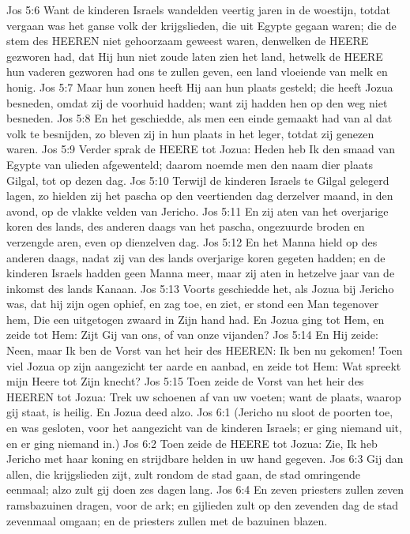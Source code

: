 Jos 5:6  Want de kinderen Israels wandelden veertig jaren in de woestijn, totdat vergaan was het ganse volk der krijgslieden, die uit Egypte gegaan waren; die de stem des HEEREN niet gehoorzaam geweest waren, denwelken de HEERE gezworen had, dat Hij hun niet zoude laten zien het land, hetwelk de HEERE hun vaderen gezworen had ons te zullen geven, een land vloeiende van melk en honig.
Jos 5:7  Maar hun zonen heeft Hij aan hun plaats gesteld; die heeft Jozua besneden, omdat zij de voorhuid hadden; want zij hadden hen op den weg niet besneden.
Jos 5:8  En het geschiedde, als men een einde gemaakt had van al dat volk te besnijden, zo bleven zij in hun plaats in het leger, totdat zij genezen waren.
Jos 5:9  Verder sprak de HEERE tot Jozua: Heden heb Ik den smaad van Egypte van ulieden afgewenteld; daarom noemde men den naam dier plaats Gilgal, tot op dezen dag.
Jos 5:10  Terwijl de kinderen Israels te Gilgal gelegerd lagen, zo hielden zij het pascha op den veertienden dag derzelver maand, in den avond, op de vlakke velden van Jericho.
Jos 5:11  En zij aten van het overjarige koren des lands, des anderen daags van het pascha, ongezuurde broden en verzengde aren, even op dienzelven dag.
Jos 5:12  En het Manna hield op des anderen daags, nadat zij van des lands overjarige koren gegeten hadden; en de kinderen Israels hadden geen Manna meer, maar zij aten in hetzelve jaar van de inkomst des lands Kanaan.
Jos 5:13  Voorts geschiedde het, als Jozua bij Jericho was, dat hij zijn ogen ophief, en zag toe, en ziet, er stond een Man tegenover hem, Die een uitgetogen zwaard in Zijn hand had. En Jozua ging tot Hem, en zeide tot Hem: Zijt Gij van ons, of van onze vijanden?
Jos 5:14  En Hij zeide: Neen, maar Ik ben de Vorst van het heir des HEEREN: Ik ben nu gekomen! Toen viel Jozua op zijn aangezicht ter aarde en aanbad, en zeide tot Hem: Wat spreekt mijn Heere tot Zijn knecht?
Jos 5:15  Toen zeide de Vorst van het heir des HEEREN tot Jozua: Trek uw schoenen af van uw voeten; want de plaats, waarop gij staat, is heilig. En Jozua deed alzo.
Jos 6:1  (Jericho nu sloot de poorten toe, en was gesloten, voor het aangezicht van de kinderen Israels; er ging niemand uit, en er ging niemand in.)
Jos 6:2  Toen zeide de HEERE tot Jozua: Zie, Ik heb Jericho met haar koning en strijdbare helden in uw hand gegeven.
Jos 6:3  Gij dan allen, die krijgslieden zijt, zult rondom de stad gaan, de stad omringende eenmaal; alzo zult gij doen zes dagen lang.
Jos 6:4  En zeven priesters zullen zeven ramsbazuinen dragen, voor de ark; en gijlieden zult op den zevenden dag de stad zevenmaal omgaan; en de priesters zullen met de bazuinen blazen.
